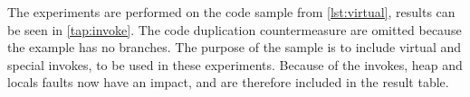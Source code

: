 The experiments are performed on the code sample from \cref{lst:virtual}, results can be seen in \cref{tap:invoke}. The code duplication countermeasure are omitted because the example has no branches. The purpose of the sample is to include virtual and special invokes, to be used in these experiments. Because of the invokes, heap and locals faults now have an impact, and are therefore included in the result table.\\\\
